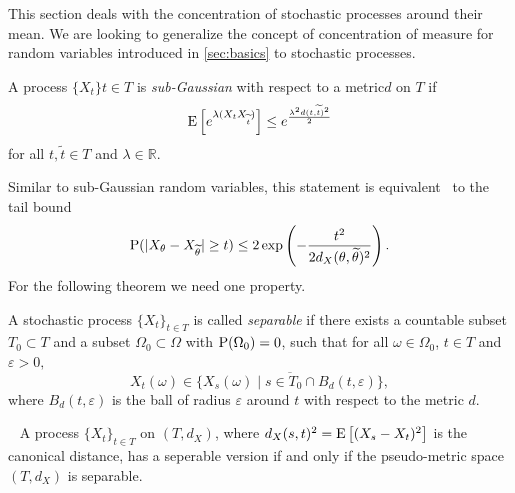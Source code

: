 This section deals with the concentration of stochastic processes around their mean.
We are looking to generalize the concept of concentration of measure for random variables introduced in \cref{sec:basics} to stochastic processes.
\begin{definition}
    A  process \(\{X_{t}\}t \in T\) is \textit{sub-Gaussian} with respect to a metric\(d\) on \(T\) if
    \[
        \operatorname*{E}\left[e^{\lambda(X_{t}X_{\widetilde{t}})}\right] \leq e^{\frac{\lambda^2 d(t, \widetilde{t})^2}{2}} 
    \]
    for all \(t, \tilde{t} \in T\) and \(\lambda \in \mathbb{R}\).    
\end{definition}
Similar to sub-Gaussian random variables, this statement is equivalent~\cite[p.134]{wainwright2019high}
to the tail bound
\[
    \mathrm{P}( \lvert X_{\theta} - X_{\widetilde{\theta}} \rvert \geq t) \leq 2 \exp\left(-\frac{t^2}{2 d_{X}(\theta, \widetilde{\theta})^2}\right).
\]
% 
% 
For the following theorem we need one property.
\begin{definition}
    A stochastic process \( \{ X_{t} \}_{t \in T} \) is called \textit{separable} if there exists a countable subset \( T_{0} \subset T \) and a subset \( \Omega_{0} \subset \Omega \) with \( \mathrm{P}(\Omega_{0}) = 0 \), such that for all \( \omega \in \Omega_{0}\), \( t \in T \) and \( \varepsilon>0, \)
    \[
        X_{t}(\omega) \in \overline{\{ X_{s}(\omega) \mid s \in T_{0} \cap B_{d}(t,\varepsilon) \}},
    \]
    where \( B_{d}(t,\varepsilon) \) is the ball of radius \( \varepsilon \) around \( t \) with respect to the metric \( d \).
\end{definition}
\begin{proposition}
    ~\label{prop:concentration_ineq}
    \cite[Prop. 2.1.12]{gine2021mathematical}
    A process \( \{ X_{t} \}_{t \in T} \) on \( (T,d_{X}) \), where \( d_{X}(s,t)^2 = \operatorname*{E}\left[(X_{s}-X_{t})^2\right]\) is the canonical distance, has a seperable version if and only if the pseudo-metric space \( (T,d_{X}) \) is separable.
\end{proposition}
